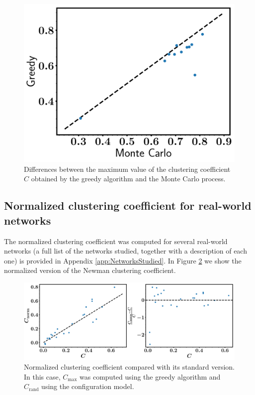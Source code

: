 \documentclass{article}
\begin{document}
\begin{figure}[ht!]
\centering
\includegraphics[scale=0.35]{./figs/Cmax_MC_vs_greedy}
\caption{Differences between the maximum value of the clustering coefficient $C$ obtained by the greedy algorithm and the Monte Carlo process.}
\label{fig:Cmax_MC_vs_greedy}
\end{figure}

\subsection{Normalized clustering coefficient for real-world networks}

The normalized clustering coefficient was computed for several real-world networks (a full list of the networks studied, together with a description of each one) is provided in Appendix \ref{app:NetworksStudied}. In Figure \ref{fig:Cnorm_vs_C} we show the normalized version of the Newman clustering coefficient.

\begin{figure}[ht!]
\centering
\includegraphics[scale=0.35]{./figs/Cnorm_vs_C}
\caption{Normalized clustering coefficient compared with its standard version. In this case, $C_{\mathrm{max}}$ was computed using the greedy algorithm and $C_{\mathrm{rand}}$ using the configuration model.}
\label{fig:Cnorm_vs_C}
\end{figure}
\end{document}
